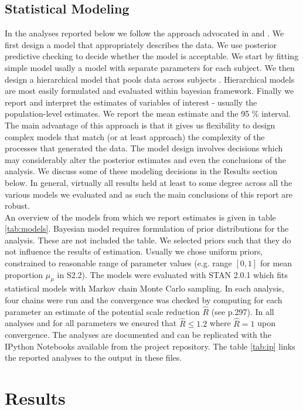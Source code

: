 \documentclass[10pt]{article}
\begin{document}
\subsection*{Statistical Modeling}
In the analyses reported below we follow the approach advocated in \cite{gelman07} and \cite{gelman12}. 
We first design a model that appropriately describes the data. 
We use posterior predictive checking to decide whether the model is acceptable. 
We start by fitting simple model usally a model with separate parameters for each subject. 
We then design a hierarchical model that pools data across subjects \cite{lee11a}. 
Hierarchical models are most easily formulated and evaluated within bayesian framework.
Finally we report and interpret the estimates of variables of interest - usually the population-level estimates. 
We report the mean estimate and the 95 \% interval.\\
The main advantage of this approach is that it gives us flexibility to design complex models that match (or at least approach) the complexity of the processes that generated the data.
The model design involves decisions which may considerably alter the posterior estimates and even the conclusions of the analysis.
We discuss some of these modeling decisions in the Results section below. In general, virtually all results held at least to some degree across all the various models we evaluated and as such the main conclusions of this report are robust.\\
An overview of the models from which we report estimates is given in table \ref{tab:models}. 
Bayesian model requires formulation of prior distributions for the analysis. 
These are not included the table. 
We selected priors such that they do not influence the results of estimation. 
Usually we chose uniform priors, constrained to reasonable range of parameter values (e.g. range $[0,1]$ for mean proportion $\mu_{\mu}$ in S2.2). 
The models were evaluated with STAN 2.0.1 which fits statistical models with Markov chain Monte Carlo sampling. 
In each analysis, four chains were run and the convergence was checked by computing for each parameter an estimate of the potential scale reduction $\hat{R}$ (see \cite{gelman03} p.297). 
In all analyses and for all parameters we ensured that $\hat{R} \leq 1.2$ where $\hat{R} = 1$ upon convergence.
The analyses are documented and can be replicated with the IPython Notebooks available from the project repository.
The table \ref{tab:ip} links the reported analyses to the output in these files. 
\section*{Results}
\end{document}
